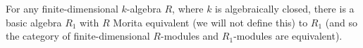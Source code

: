For any finite-dimensional $k$-algebra $R$, where $k$ is algebraically closed,
there is a basic algebra $R_1$ with $R$ Morita equivalent (we will not define
this) to $R_1$ (and so the category of finite-dimensional $R$-modules and
$R_1$-modules are equivalent).
